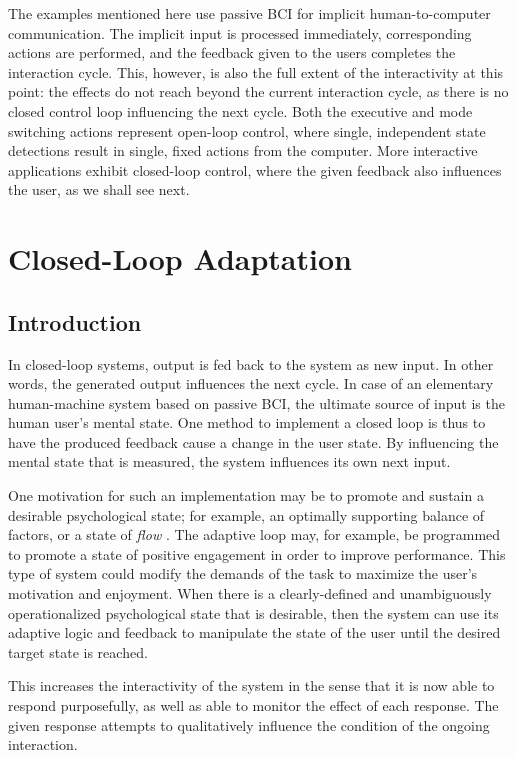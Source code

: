 The examples mentioned here use passive BCI for implicit human-to-computer communication. The implicit input is processed immediately, corresponding actions are performed, and the feedback given to the users completes the interaction cycle. This, however, is also the full extent of the interactivity at this point: the effects do not reach beyond the current interaction cycle, as there is no closed control loop influencing the next cycle. Both the executive and mode switching actions represent open-loop control, where single, independent state detections result in single, fixed actions from the computer. More interactive applications exhibit closed-loop control, where the given feedback also influences the user, as we shall see next.


\section{Closed-Loop Adaptation}
\label{pbci:closedloop}%


\subsection{Introduction}

In closed-loop systems, output is fed back to the system as new input. In other words, the generated output influences the next cycle. In case of an elementary human-machine system based on passive BCI, the ultimate source of input is the human user's mental state. One method to implement a closed loop is thus to have the produced feedback cause a change in the user state. By influencing the mental state that is measured, the system influences its own next input. 

One motivation for such an implementation may be to promote and sustain a desirable psychological state; for example, an optimally supporting balance of factors, or a state of \emph{flow} \cite{csikszentmihalyi2008flow}. The adaptive loop may, for example, be programmed to promote a state of positive engagement in order to improve performance. This type of system could modify the demands of the task to maximize the user's motivation and enjoyment. When there is a clearly-defined and unambiguously operationalized psychological state that is desirable, then the system can use its adaptive logic and feedback to manipulate the state of the user until the desired target state is reached.

This increases the interactivity of the system in the sense that it is now able to respond purposefully, as well as able to monitor the effect of each response. The given response attempts to qualitatively influence the condition of the ongoing interaction.

